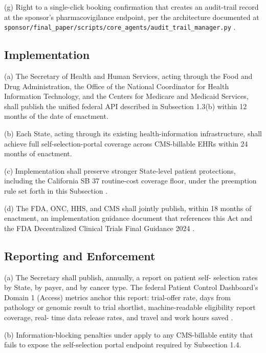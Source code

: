 (g) Right to a single-click booking confirmation that creates an
audit-trail record at the sponsor's pharmacovigilance endpoint, per
the architecture documented at
\texttt{sponsor/final\_paper/scripts/core\_agents/audit\_trail\_manager.py}
\cite{kawchak_2026_19396256}.

\subsection{Implementation}

(a) The Secretary of Health and Human Services, acting through the
Food and Drug Administration, the Office of the National Coordinator
for Health Information Technology, and the Centers for Medicare and
Medicaid Services, shall publish the unified federal API described in
Subsection 1.3(b) within 12 months of the date of enactment.

(b) Each State, acting through its existing health-information
infrastructure, shall achieve full self-selection-portal coverage
across CMS-billable EHRs within 24 months of enactment.

(c) Implementation shall preserve stronger State-level patient
protections, including the California SB 37 routine-cost coverage
floor, under the preemption rule set forth in this Subsection
\cite{rank8_california_sb37_2001, rank4_fdora_fda_modernization_2022}.

(d) The FDA, ONC, HHS, and CMS shall jointly publish, within 18
months of enactment, an implementation guidance document that
references this Act and the FDA Decentralized Clinical Trials Final
Guidance 2024 \cite{fda_dct_guidance_2024}.

\subsection{Reporting and Enforcement}

(a) The Secretary shall publish, annually, a report on patient self-
selection rates by State, by payer, and by cancer type. The federal
Patient Control Dashboard's Domain 1 (Access) metrics anchor this
report: trial-offer rate, days from pathology or genomic result to
trial shortlist, machine-readable eligibility report coverage, real-
time data release rates, and travel and work hours saved
\cite{hhs_right_to_access_2025, rocque2025remote_symptom_monitoring}.

(b) Information-blocking penalties under
\cite{federal_register_info_blocking_disincentives_2024} apply to any
CMS-billable entity that fails to expose the self-selection portal
endpoint required by Subsection 1.4.

